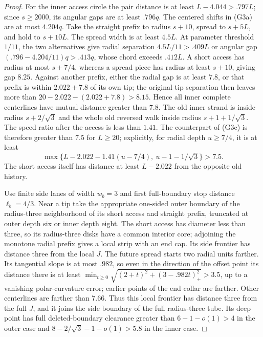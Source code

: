 \begin{proof}
For the inner access circle the pair distance is at least
\(L-4.044>.797L\); since \(s\ge2000\), its angular gaps are at least
\(.796q\).  The centered shifts in (G3a) are at most \(4.204q\).
Take the straight prefix to radius \(s+10\), spread to \(s+5L\), and
hold to \(s+10L\).  The spread width is at least \(4.5L\).  At parameter
threshold \(1/11\), the two alternatives give radial separation
\(4.5L/11>.409L\) or angular gap
\((.796-4.204/11)q>.413q\), whose chord exceeds \(.412L\).
A short access has radius at most \(s+7/4\), whereas a spread piece has
radius at least \(s+10\), giving gap \(8.25\).  Against another prefix,
either the radial gap is at least \(7.8\), or that prefix is within
\(2.022+7.8\) of its own tip; the original tip separation then leaves
more than \(20-2.022-(2.022+7.8)>8.15\).  Hence all inner complete
centerlines have mutual distance greater than \(7.8\).  The old inner
strand is inside radius \(s+2/\sqrt3\) and the whole old reversed walk
inside radius \(s+1+1/\sqrt3\).  The speed ratio after the access is
less than \(1.41\).  The counterpart of (G3c) is therefore greater
than \(7.5\) for \(L\ge20\); explicitly, for radial depth \(u\ge7/4\),
it is at least
\[
 \max\{L-2.022-1.41(u-7/4),\ u-1-1/\sqrt3\}>7.5.          \tag{G3j}
\]
The short access itself has distance at least \(L-2.022\) from the
opposite old history.

Use finite side lanes of width \(w_b=3\) and first full-boundary stop
distance \(\ell_b=4/3\).  Near a tip take the appropriate one-sided
outer boundary of the radius-three neighborhood of its short access and
straight prefix, truncated at outer depth six or inner depth eight.  The
short access has diameter less than three, so its radius-three disks have
a common interior core; adjoining the monotone radial prefix gives a local
strip with an end cap.  Its side frontier has distance three from the local
\(J\).  The future spread starts two radial units farther.  Its tangential
slope is at most \(.982\), so even in the direction of the offset point its
distance there is at least
\(\min_{t\ge0}\sqrt{(2+t)^2+(3-.982t)_+^2}>3.5\), up to a vanishing
polar-curvature error; earlier points of the end collar are farther.
Other centerlines are farther than \(7.66\).  Thus this local frontier
has distance three from the full \(J\), and it joins the side boundary of
the full radius-three tube.  Its deep point has full deleted-boundary
clearance greater than \(6-1-o(1)>4\) in the outer case and
\(8-2/\sqrt3-1-o(1)>5.8\) in the inner case.


\end{proof}
